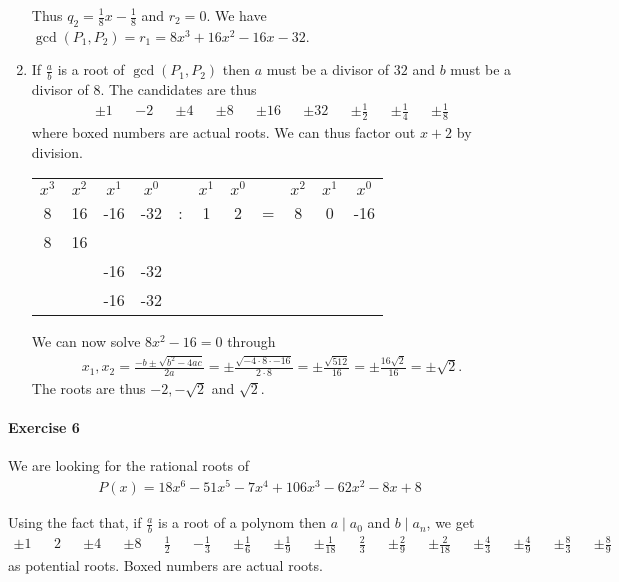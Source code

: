 \documentclass{article}
\begin{document}
\begin{enumerate}
    Thus $q_2 = \frac{1}{8}x - \frac{1}{8}$ and $r_2 = 0$. We have $\gcd(P_1, P_2) = r_1 = 8x^3 + 16x^2 - 16x - 32$.

    \item If $\frac{a}{b}$ is a root of $\gcd(P_1, P_2)$ then $a$ must be a divisor of $32$ and $b$ must be a divisor of $8$. The candidates are thus 
    \begin{align*}
        \pm1&&\boxed{-2}&&\pm4&&\pm8&&\pm16&&\pm32&&\pm\frac{1}{2}&&\pm\frac{1}{4}&&\pm\frac{1}{8}
    \end{align*}
    where boxed numbers are actual roots. We can thus factor out $x + 2$ by division.

    \begin{center}
        \begin{tabular}{cccc c cc c ccc}
            $x^3$&$x^2$&$x^1$&$x^0$&&$x^1$&$x^0$&&$x^2$&$x^1$&$x^0$ \\
            8&16&-16&-32&:&1&2&=&8&0&-16\\
            8&16\\\cmidrule{1-2}
            &&-16&-32\\
            &&-16&-32\\\cmidrule{3-4}
        \end{tabular}
    \end{center}

    We can now solve $8x^2 - 16 = 0$ through
    \begin{align*}
        x_1,x_2 = \frac{-b \pm \sqrt{b^2 - 4ac}}{2a} =
        \pm\frac{\sqrt{-4 \cdot 8 \cdot -16}}{2 \cdot 8} =
        \pm\frac{\sqrt{512}}{16} =
        \pm\frac{16\sqrt{2}}{16} = \pm \sqrt{2}.
    \end{align*}
    The roots are thus $-2, -\sqrt{2}$ and $\sqrt{2}$.
\end{enumerate}

\pagebreak
\paragraph{Exercise 6}

We are looking for the rational roots of
\begin{align*}
    P(x) = 18 x^6 - 51 x^5 - 7 x^4 + 106 x^3 - 62 x^2 - 8 x + 8
\end{align*}

Using the fact that, if $\frac{a}{b}$ is a root of a polynom then $a \mid a_0$ and $b \mid a_n$, we get
\begin{align*}
    \pm1&&\boxed{2}&&\pm4&&\pm8&&\boxed{\frac{1}{2}}&&\boxed{-\frac{1}{3}}&&\pm\frac{1}{6}&&\pm\frac{1}{9}&&\pm\frac{1}{18}&&\boxed{\frac{2}{3}}&&\pm\frac{2}{9}&&\pm\frac{2}{18}&&\pm\frac{4}{3}&&\pm\frac{4}{9}&&\pm\frac{8}{3}&&\pm\frac{8}{9}
\end{align*}
as potential roots. Boxed numbers are actual roots.
\end{document}
